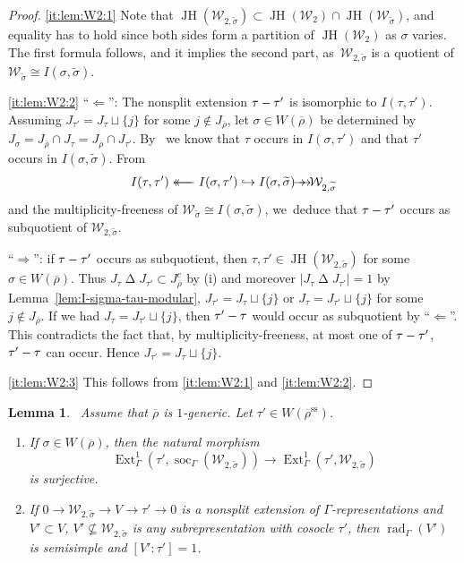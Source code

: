 \documentclass[JEP,XML,SOM,Unicode,NoFloatCountersInSection, NoEqCountersInSection,published]{cedram}
\newcommand\hto{\mathrel{\lhook\joinrel\to}}
\newcommand{\onto}{\mathchoice{\to\hspace*{-5mm}\to}{\mathrel{\hbox{$\to\hspace*{-2.85mm}\to$}}}{\to\hspace*{-3mm}\to}{\to\hspace*{-3mm}\to}}
\newcommand\from{\mathchoice{\longleftarrow}{\leftarrow}{\leftarrow}{\leftarrow}}
\newcommand{\onfrom}{\mathchoice{\from\hspace*{-5mm}\from}{\from\hspace*{-2.85mm}\from}{\from\hspace*{-3mm}\from}{\from\hspace*{-3mm}\from}}
\let\wt\widetilde
\newcommand{\cW}{\mathcal{W}}
\renewcommand{\ss}{\mathrm{ss}}
\newcommand{\brho}{\overline{\rho}}
\DeclareMathOperator{\Ext}{Ext}
\DeclareMathOperator{\JH}{\mathrm{JH}}
\DeclareMathOperator{\rad}{rad}
\DeclareMathOperator{\soc}{soc}
\theoremstyle{plain}
\newtheorem{lem}[prop]{Lemma}
\theoremstyle{definition}
\begin{document}
\skpt
\begin{proof}
\eqref{it:lem:W2:1}
Note that $\JH(\mathcal{W}_{2,\wt{\sigma}}) \subset \JH(\cW_2) \cap \JH(\mathcal{W}_{\wt{\sigma}})$, and equality has to hold since both sides form a partition of $\JH(\cW_2)$ as $\sigma$ varies.
The first formula follows, and it implies the second part, as~$\mathcal{W}_{2,\wt{\sigma}}$ is a quotient of $\mathcal{W}_{\wt{\sigma}} \cong I(\sigma,\wt{\sigma})$.

\eqref{it:lem:W2:2}
``$\Leftarrow$'':
The nonsplit extension $\tau \-- \tau'$ is isomorphic to $I(\tau,\tau')$.
Assuming $J_{\tau'}=J_{\tau}\sqcup\{j\}$ for some $j\notin J_{\brho}$, let $\sigma \in W(\brho)$ be determined by $J_\sigma = J_{\brho} \cap J_\tau = J_{\brho} \cap J_{\tau'}$. By~\cite[Lem.\,4.1.3]{BHHMS4} we know that $\tau$ occurs in $I(\sigma,\tau')$ and that $\tau'$ occurs in $I(\sigma,\wt\sigma)$.
From
\[
I(\tau,\tau') \onfrom I(\sigma,\tau') \hto I(\sigma,\wt\sigma) \onto \mathcal{W}_{2,\wt\sigma}
\]
and the multiplicity-freeness of $\cW_{\wt\sigma} \cong I(\sigma,\wt\sigma)$, we~deduce that $\tau \-- \tau'$ occurs as subquotient of $\mathcal{W}_{2,\wt\sigma}$.

``$\Rightarrow$'': if $\tau \-- \tau'$ occurs as subquotient, then $\tau,\tau' \in \JH(\cW_{2,\wt\sigma})$ for some $\sigma \in W(\brho)$.
Thus $J_\tau \mathbin\Delta J_{\tau'} \subset J_{\brho}^c$ by (i) and moreover $|J_\tau \mathbin\Delta J_{\tau'}| = 1$ by Lemma~\ref{lem:I-sigma-tau-modular}, \ie $J_{\tau'}=J_{\tau}\sqcup\{j\}$ or $J_{\tau}=J_{\tau'}\sqcup\{j\}$ for some $j\notin J_{\brho}$.
If we had $J_{\tau}=J_{\tau'}\sqcup\{j\}$, then $\tau' \-- \tau$ would occur as subquotient by ``$\Leftarrow$''.
This contradicts the fact that, by multiplicity-freeness, at most one of $\tau \-- \tau'$, $\tau' \-- \tau$ can occur.
Hence $J_{\tau'}=J_{\tau}\sqcup\{j\}$.

\eqref{it:lem:W2:3}
This follows from \eqref{it:lem:W2:1} and \eqref{it:lem:W2:2}.
\end{proof}

\begin{lem}\label{lem:Ext1-W2}\
Assume that $\brho$ is $1$-generic. Let $\tau'\in W(\brho^\ss)$.

\begin{enumerate}
\item
\label{it:lem:Ext1-W2:1}
If $\sigma\in W(\brho)$, then the natural morphism
\begin{equation}\label{eq:Ext1-W2}
\Ext^1_{\Gamma}(\tau',\soc_\Gamma(\mathcal{W}_{2,\wt{\sigma}}))\to \Ext^1_{\Gamma}(\tau',\mathcal{W}_{2,\wt{\sigma}})
\end{equation}
is surjective.

\item
\label{it:lem:Ext1-W2:2}
If $0 \to \mathcal{W}_{2,\wt{\sigma}} \to V \to \tau' \to 0$ is a nonsplit extension of $\Gamma$-representations and $V'\subset V$, $V'\nsubseteq \mathcal{W}_{2,\wt{\sigma}}$ is any subrepresentation with cosocle $\tau'$, then $\rad_\Gamma(V')$ is semisimple and $[V':\tau'] = 1$.
\end{enumerate}
\end{lem}
\end{document}
